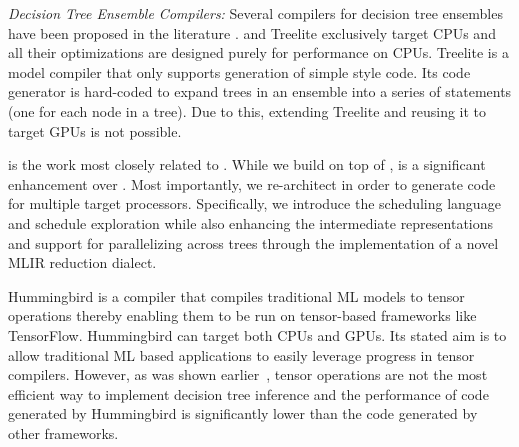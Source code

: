 \emph{Decision Tree Ensemble Compilers:}
Several compilers for decision tree ensembles have been proposed in the 
literature \cite{Treelite, Treebeard, Hummingbird}. \TreebeardOLD{} and Treelite
exclusively target CPUs and all their optimizations are designed purely for 
performance on CPUs. 
Treelite\cite{Treelite} is a model compiler that only supports 
generation of simple  style code. Its code generator is hard-coded 
to expand trees in an ensemble into a series of  statements (one for 
each node in a tree). Due to this, extending Treelite and reusing it to 
target GPUs is not possible.

\TreebeardOLD{} is the work most closely related to \Treebeard{}. While we 
build on top of \TreebeardOLD{}, \Treebeard{} is a significant enhancement 
over \TreebeardOLD{}. Most importantly, we re-architect \TreebeardOLD{} in 
order to generate code for multiple target processors. Specifically, we 
introduce the scheduling language and schedule exploration 
while also enhancing the intermediate representations and support for parallelizing 
across trees through the implementation of a novel MLIR reduction dialect.

Hummingbird\cite{Hummingbird} is a compiler that compiles traditional ML models
to tensor operations thereby enabling them to be run on tensor-based frameworks like
TensorFlow. Hummingbird can target both CPUs
and GPUs. Its stated aim is to allow traditional ML based applications to easily 
leverage progress in tensor compilers. However, as was shown earlier~\cite{Treebeard},
tensor operations are not the most efficient way to implement decision tree inference
and the performance of code generated by Hummingbird is significantly lower than 
the code generated by other frameworks.


